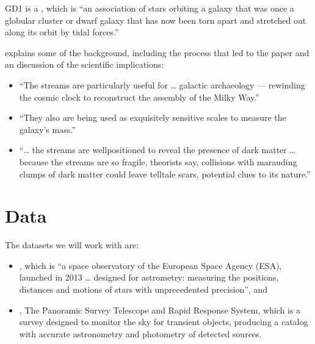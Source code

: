 \documentclass[letterpaper,10pt,english]{sphinxmanual}
\begin{document}
GD\sphinxhyphen{}1 is a , which is “an association of stars orbiting a galaxy that was once a globular cluster or dwarf galaxy that has now been torn apart and stretched out along its orbit by tidal forces.”

 explains some of the background, including the process that led to the paper and an discussion of the scientific implications:
\begin{itemize}
\item {} 
“The streams are particularly useful for … galactic archaeology — rewinding the cosmic clock to reconstruct the assembly of the Milky Way.”

\item {} 
“They also are being used as exquisitely sensitive scales to measure the galaxy’s mass.”

\item {} 
“… the streams are well\sphinxhyphen{}positioned to reveal the presence of dark matter … because the streams are so fragile, theorists say, collisions with marauding clumps of dark matter could leave telltale scars, potential clues to its nature.”

\end{itemize}


\section{Data}
\label{\detokenize{01_query:data}}
The datasets we will work with are:
\begin{itemize}
\item {} 
, which is “a space observatory of the European Space Agency (ESA), launched in 2013 … designed for astrometry: measuring the positions, distances and motions of stars with unprecedented precision”, and

\item {} 
, The Panoramic Survey Telescope and Rapid Response System, which is a survey designed to monitor the sky for transient objects, producing a catalog with accurate astronometry and photometry of detected sources.

\end{itemize}
\end{document}
